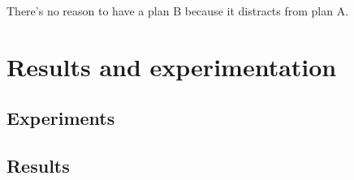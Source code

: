 
\begin{savequote}[70mm]
	There's no reason to have a plan B because it distracts from plan A.
\end{savequote}

\chapter{Results and experimentation}\label{chapter:results}
	
	\section{Experiments}
	
	\section{Results}
